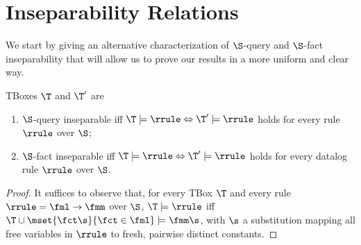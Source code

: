 
\section{Inseparability Relations}

We start by giving an alternative characterization of $\S$-query and $\S$-fact inseparability 
that will allow us to prove our results in a more uniform and clear way.

\begin{proposition} \label{prop:fq-insep-charact-rules}
TBoxes $\T$ and $\T'$ are
\begin{enumerate}
\item $\S$-query inseparable iff $\T\models \rrule \Leftrightarrow \T'\models \rrule$ holds for every rule $\rrule$ over $\S$;
\item $\S$-fact inseparable iff $\T\models \rrule \Leftrightarrow \T'\models \rrule$ holds for every datalog rule $\rrule$ over $\S$.
\end{enumerate}
\end{proposition}
\begin{proof}
 It suffices to observe that, for every TBox $\T$ and every rule $\rrule=\fml\to\fmm$ over $\S$, 
 $\T\models\rrule$ iff $\T\cup\mset{\fct\s}{\fct\in\fml}\models\fmm\s$, with $\s$ a substitution 
 mapping all free variables in $\rrule$ to fresh, pairwise distinct constants.
\end{proof}

